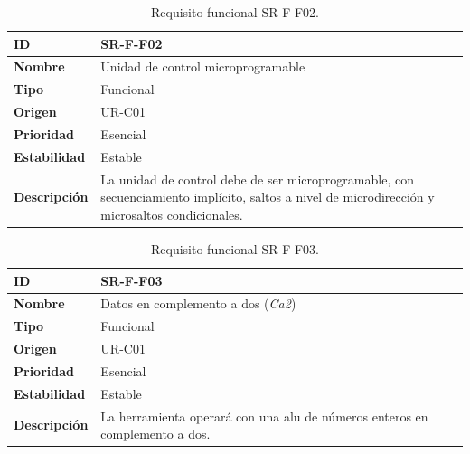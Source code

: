 \begin{center}
\begin{table}[htbp]
\centering
\caption{Requisito funcional SR-F-F02.}
\begin{tabular}{@{}p{2.5cm} p{9cm}@{}} 
\toprule
\textbf{ID} 				& SR-F-F02 \\
\midrule
\textbf{Nombre} 			& Unidad de control microprogramable \\
\midrule
\textbf{Tipo} 			& Funcional \\
\midrule
\textbf{Origen} 			& UR-C01 \\
\midrule
\textbf{Prioridad}		& Esencial \\
\midrule
\textbf{Estabilidad} 		& Estable \\
\midrule
\textbf{Descripción} 	& La unidad de control debe de ser microprogramable, con secuenciamiento implícito, saltos a nivel de microdirección y microsaltos condicionales. \\
\bottomrule
\end{tabular}
\label{tab:srff02}
\end{table}
\end{center}

\begin{center}
\begin{table}[htbp]
\centering
\caption{Requisito funcional SR-F-F03.}
\begin{tabular}{@{}p{2.5cm} p{9cm}@{}} 
\toprule
\textbf{ID} 				& SR-F-F03 \\
\midrule
\textbf{Nombre} 			& Datos en complemento a dos (\emph{Ca2}) \\
\midrule
\textbf{Tipo} 			& Funcional \\
\midrule
\textbf{Origen} 			& UR-C01 \\
\midrule
\textbf{Prioridad}		& Esencial \\
\midrule
\textbf{Estabilidad} 		& Estable \\
\midrule
\textbf{Descripción} 	& La herramienta operará con una \acrshort{alu} de números enteros en complemento a dos. \\
\bottomrule
\end{tabular}
\label{tab:srff03}
\end{table}
\end{center}

